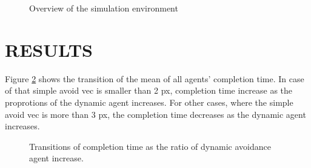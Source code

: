 \documentclass[letterpaper, 10 pt, conference]{ieeeconf}  %
\begin{document}
\begin{figure}[thpb]
   \centering
   \caption{Overview of the simulation environment}
   \label{fig:sim_env}
\end{figure}

\section{RESULTS} 
Figure \ref{fig:result_time} shows the transition of the mean of all agents' completion time. In case of that simple avoid vec is smaller than 2 px, completion time increase as the proprotions of the dynamic agent increases. For other cases, where the simple avoid vec is more than 3 px, the completion time decreases as the dynamic agent increases.

\begin{figure}[thpb]
   \centering
   \caption{Transitions of completion time as the ratio of dynamic avoidance agent increase.}
   \label{fig:result_time}
\end{figure}
\end{document}

